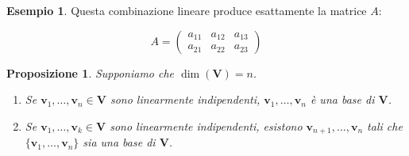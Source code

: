 \documentclass{article}
\theoremstyle{plain}
\newtheorem{prop}[thm]{Proposizione}
\theoremstyle{definition}
\newtheorem{exmp}{Esempio}[section]
\theoremstyle{remark}
\begin{document}
\begin{exmp}
Questa combinazione lineare produce esattamente la matrice \( A \):

\[
A = \begin{pmatrix}
a_{11} & a_{12} & a_{13} \\
a_{21} & a_{22} & a_{23}
\end{pmatrix}
\]
\end{exmp}

\vspace{10pt}

\begin{bxthm}
\begin{prop}\label{prop:quattrosedici}
    Supponiamo che \(\dim(\mathbf{V}) = n\).
    \begin{enumerate}
        \item Se \( \mathbf{v}_1, \ldots, \mathbf{v}_n \in \mathbf{V} \) sono linearmente indipendenti, \( \mathbf{v}_1, \ldots, \mathbf{v}_n \) è una base di \( \mathbf{V} \).
        \item Se \( \mathbf{v}_1, \ldots, \mathbf{v}_k \in \mathbf{V}\) sono linearmente indipendenti, esistono \( \mathbf{v}_{n+1}, \ldots, \mathbf{v}_n \) tali che \( \{\mathbf{v}_1, \ldots, \mathbf{v}_n\} \) sia una base di \( \mathbf{V} \).
    \end{enumerate}
\end{prop}
\end{bxthm}
\end{document}
